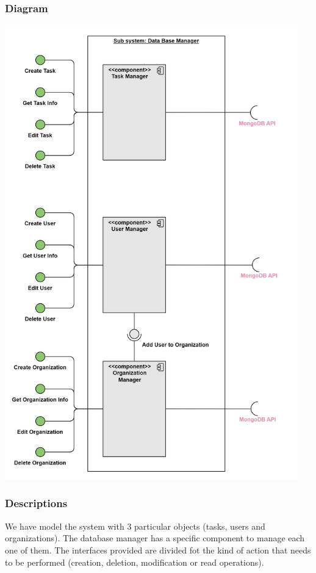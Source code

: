 \documentclass{article}
\begin{document}
\subsubsection{Diagram}
\begin{center}
\includegraphics[width=5in,height=\textheight,keepaspectratio]{images/component_diagram/data_base_manager.jpg}
\end{center}
\subsubsection{Descriptions}

We have model the system with 3 particular objects (tasks, users and organizations).
The database manager has a specific component to manage each one of them. The interfaces provided
are divided fot the kind of action that needs to be performed (creation, deletion, modification or read operations).
\end{document}
